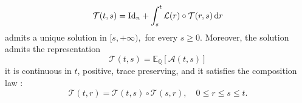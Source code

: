 \begin{theorem}
\begin{equation}
	\mathcal{T}(t, s)=\mathrm{Id}_{n}+\int_{s}^{t} \mathcal{L}(r) \circ \mathcal{T}(r, s) \,\mathrm{d} r
	\end{equation}
	admits a unique solution in $[s,+\infty),$ for every $s \geq 0 .$ Moreover, the solution admits the representation
	 \begin{equation}\label{conclusion:representation_instrument}
	\mathcal{T}(t, s)=\mathbb{E}_{\mathbb{Q}}[\mathcal{A}(t, s)]
	\end{equation}
	it is continuous in $t$, positive, trace preserving, and it satisfies the composition law :
	 \begin{equation}\label{conclusion:composition_instrument}
	\mathcal{T}(t, r)=\mathcal{T}(t, s) \circ \mathcal{T}(s, r), \quad 0 \leq r \leq s \leq t .
	\end{equation}
\end{theorem}
